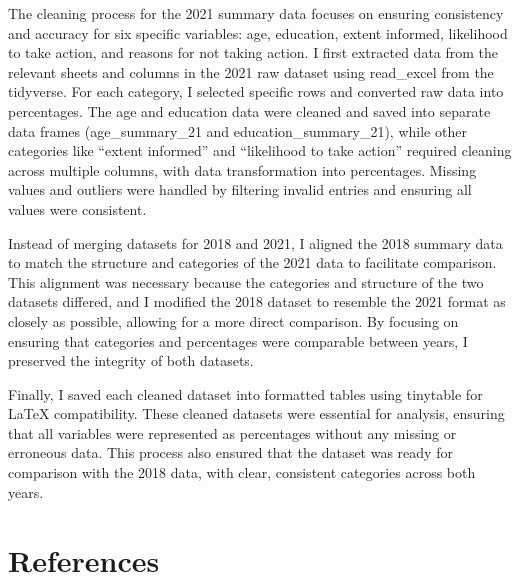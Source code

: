\documentclass[
  letterpaper,
  DIV=11,
  numbers=noendperiod]{scrartcl}
\begin{document}
The cleaning process for the 2021 summary data focuses on ensuring
consistency and accuracy for six specific variables: age, education,
extent informed, likelihood to take action, and reasons for not taking
action. I first extracted data from the relevant sheets and columns in
the 2021 raw dataset using read\_excel from the tidyverse. For each
category, I selected specific rows and converted raw data into
percentages. The age and education data were cleaned and saved into
separate data frames (age\_summary\_21 and education\_summary\_21),
while other categories like ``extent informed'' and ``likelihood to take
action'' required cleaning across multiple columns, with data
transformation into percentages. Missing values and outliers were
handled by filtering invalid entries and ensuring all values were
consistent.

Instead of merging datasets for 2018 and 2021, I aligned the 2018
summary data to match the structure and categories of the 2021 data to
facilitate comparison. This alignment was necessary because the
categories and structure of the two datasets differed, and I modified
the 2018 dataset to resemble the 2021 format as closely as possible,
allowing for a more direct comparison. By focusing on ensuring that
categories and percentages were comparable between years, I preserved
the integrity of both datasets.

Finally, I saved each cleaned dataset into formatted tables using
tinytable for LaTeX compatibility. These cleaned datasets were essential
for analysis, ensuring that all variables were represented as
percentages without any missing or erroneous data. This process also
ensured that the dataset was ready for comparison with the 2018 data,
with clear, consistent categories across both years.

\newpage

\section*{References}\label{references}
\end{document}
